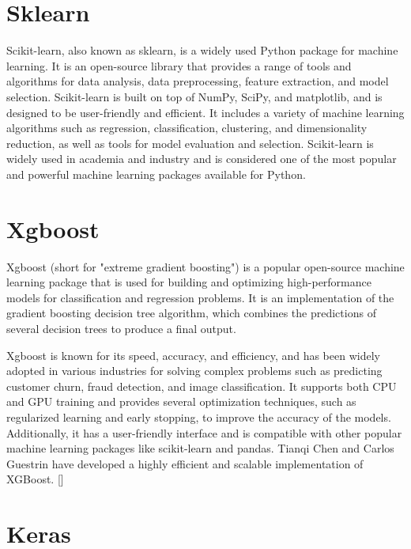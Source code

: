 \section{Sklearn}

Scikit-learn, also known as sklearn, is a widely used Python package for machine learning. It is an open-source library that provides a range of tools and algorithms for data analysis, data preprocessing, feature extraction, and model selection. Scikit-learn is built on top of NumPy, SciPy, and matplotlib, and is designed to be user-friendly and efficient. It includes a variety of machine learning algorithms such as regression, classification, clustering, and dimensionality reduction, as well as tools for model evaluation and selection. Scikit-learn is widely used in academia and industry and is considered one of the most popular and powerful machine learning packages available for Python.

\section{Xgboost}

Xgboost (short for "extreme gradient boosting") is a popular open-source machine learning package that is used for building and optimizing high-performance models for classification and regression problems. It is an implementation of the gradient boosting decision tree algorithm, which combines the predictions of several decision trees to produce a final output.

Xgboost is known for its speed, accuracy, and efficiency, and has been widely adopted in various industries for solving complex problems such as predicting customer churn, fraud detection, and image classification. It supports both CPU and GPU training and provides several optimization techniques, such as regularized learning and early stopping, to improve the accuracy of the models. Additionally, it has a user-friendly interface and is compatible with other popular machine learning packages like scikit-learn and pandas. Tianqi Chen and Carlos Guestrin have developed a highly efficient and scalable implementation of XGBoost. [\cite{Chen:2016}]

\section{Keras}


